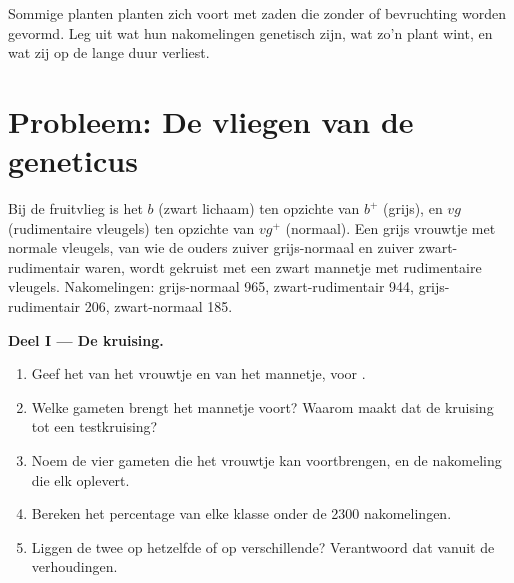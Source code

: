 \begin{exercise}[$\star\star\star$]\label{exo:g12:meiosis-genetic-shuffling:15}
Sommige planten planten zich voort met zaden die zonder  of
bevruchting worden gevormd. Leg uit wat hun nakomelingen genetisch zijn,
wat zo'n plant wint, en wat zij op de lange duur verliest.
\end{exercise}

\section{Probleem: De vliegen van de geneticus}

\begin{problem}
\label{pb:g12:meiosis-genetic-shuffling:1}
Bij de fruitvlieg is het  $b$ (zwart lichaam)  ten opzichte
van $b^+$ (grijs), en $vg$ (rudimentaire vleugels)  ten opzichte
van $vg^+$ (normaal). Een grijs vrouwtje met normale vleugels, van wie de
ouders zuiver grijs-normaal en zuiver zwart-rudimentair waren, wordt
gekruist met een zwart mannetje met rudimentaire vleugels. Nakomelingen:
grijs-normaal 965, zwart-rudimentair 944, grijs-rudimentair 206,
zwart-normaal 185.

\medskip
\noindent\textbf{Deel I --- De kruising.}
\begin{enumerate}
  \item Geef het  van het vrouwtje en van het mannetje,  voor
        .
  \item Welke gameten brengt het mannetje voort? Waarom maakt dat de
        kruising tot een testkruising?
  \item Noem de vier gameten die het vrouwtje kan voortbrengen, en de
        nakomeling die elk oplevert.
  \item Bereken het percentage van elke klasse onder de 2300
        nakomelingen.
  \item Liggen de twee  op hetzelfde  of op verschillende?
        Verantwoord dat vanuit de verhoudingen.
\end{enumerate}


\end{problem}
